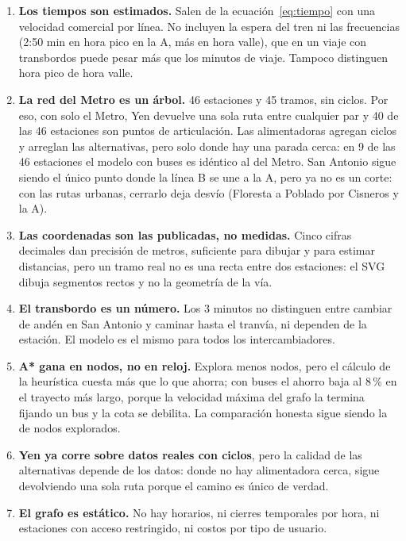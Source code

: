 \documentclass[11pt,a4paper]{article}
\begin{document}
\begin{enumerate}
  \item \textbf{Los tiempos son estimados.} Salen de la ecuación~\eqref{eq:tiempo}
        con una velocidad comercial por línea. No incluyen la espera del tren ni
        las frecuencias (2:50 min en hora pico en la A, más en hora valle), que en
        un viaje con transbordos puede pesar más que los minutos de viaje. Tampoco
        distinguen hora pico de hora valle.
  \item \textbf{La red del Metro es un árbol.} 46 estaciones y 45 tramos, sin
        ciclos. Por eso, con solo el Metro, Yen devuelve una sola ruta entre
        cualquier par y 40 de las 46 estaciones son puntos de articulación. Las
        alimentadoras agregan ciclos y arreglan las alternativas, pero solo donde
        hay una parada cerca: en 9 de las 46 estaciones el modelo con buses es
        idéntico al del Metro. San Antonio sigue siendo el único punto donde la
        línea B se une a la A, pero ya no es un corte: con las rutas urbanas,
        cerrarlo deja desvío (Floresta a Poblado por Cisneros y la A).
  \item \textbf{Las coordenadas son las publicadas, no medidas.} Cinco cifras
        decimales dan precisión de metros, suficiente para dibujar y para estimar
        distancias, pero un tramo real no es una recta entre dos estaciones: el
        SVG dibuja segmentos rectos y no la geometría de la vía.
  \item \textbf{El transbordo es un número.} Los 3 minutos no distinguen entre
        cambiar de andén en San Antonio y caminar hasta el tranvía, ni dependen de
        la estación. El modelo es el mismo para todos los intercambiadores.
  \item \textbf{A* gana en nodos, no en reloj.} Explora menos nodos, pero el
        cálculo de la heurística cuesta más que lo que ahorra; con buses el
        ahorro baja al 8\,\% en el trayecto más largo, porque la velocidad máxima
        del grafo la termina fijando un bus y la cota se debilita. La comparación
        honesta sigue siendo la de nodos explorados.
  \item \textbf{Yen ya corre sobre datos reales con ciclos}, pero la calidad de
        las alternativas depende de los datos: donde no hay alimentadora cerca,
        sigue devolviendo una sola ruta porque el camino es único de verdad.
  \item \textbf{El grafo es estático.} No hay horarios, ni cierres temporales por
        hora, ni estaciones con acceso restringido, ni costos por tipo de usuario.
\end{enumerate}
\end{document}
